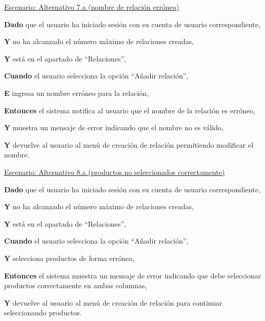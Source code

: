 \underline{Escenario: Alternativo 7.a (nombre de relación erróneo)}\par
\vspace{0.15cm}
\textbf{Dado} que el usuario ha iniciado sesión con su cuenta de usuario correspondiente,\par
\textbf{Y} no ha alcanzado el número máximo de relaciones creadas,\par
\textbf{Y} está en el apartado de \enquote{Relaciones},\par
\textbf{Cuando} el usuario selecciona la opción \enquote{Añadir relación},\par
\textbf{E} ingresa un nombre erróneo para la relación,\par
\textbf{Entonces} el sistema notifica al usuario que el nombre de la relación es erróneo,\par
\textbf{Y} muestra un mensaje de error indicando que el nombre no es válido,\par
\textbf{Y} devuelve al usuario al menú de creación de relación permitiendo modificar el nombre.\par

\vspace{0.20cm}

\underline{Escenario: Alternativo 8.a (productos no seleccionados correctamente)}\par
\vspace{0.15cm}
\textbf{Dado} que el usuario ha iniciado sesión con su cuenta de usuario correspondiente,\par
\textbf{Y} no ha alcanzado el número máximo de relaciones creadas,\par
\textbf{Y} está en el apartado de \enquote{Relaciones},\par
\textbf{Cuando} el usuario selecciona la opción \enquote{Añadir relación},\par
\textbf{Y} selecciona productos de forma errónea,\par
\textbf{Entonces} el sistema muestra un mensaje de error indicando que debe seleccionar productos correctamente en ambas columnas,\par
\textbf{Y} devuelve al usuario al menú de creación de relación para continuar seleccionando productos.\par

\vspace{0.20cm}


